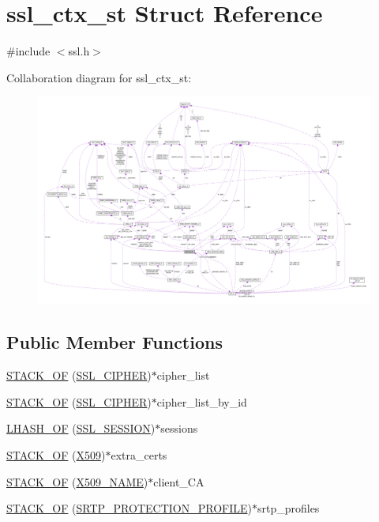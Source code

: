 \hypertarget{structssl__ctx__st}{}\section{ssl\+\_\+ctx\+\_\+st Struct Reference}
\label{structssl__ctx__st}


{\ttfamily \#include $<$ssl.\+h$>$}



Collaboration diagram for ssl\+\_\+ctx\+\_\+st\+:
\nopagebreak
\begin{figure}[H]
\begin{center}
\leavevmode
\includegraphics[width=350pt]{structssl__ctx__st__coll__graph}
\end{center}
\end{figure}
\subsection*{Public Member Functions}
\begin{DoxyCompactItemize}
\item 
\hyperlink{structssl__ctx__st_aeae48802a98db69348bba2b610fd5c0c}{S\+T\+A\+C\+K\+\_\+\+OF} (\hyperlink{ssl_8h_a548d7a5d565a9e0e9bd45c49f8c95701}{S\+S\+L\+\_\+\+C\+I\+P\+H\+ER})$\ast$cipher\+\_\+list
\item 
\hyperlink{structssl__ctx__st_aea9ca79cf751419a511ce4f171fd9064}{S\+T\+A\+C\+K\+\_\+\+OF} (\hyperlink{ssl_8h_a548d7a5d565a9e0e9bd45c49f8c95701}{S\+S\+L\+\_\+\+C\+I\+P\+H\+ER})$\ast$cipher\+\_\+list\+\_\+by\+\_\+id
\item 
\hyperlink{structssl__ctx__st_a31f304395cbaf8bdbf2eae3693f3d0f4}{L\+H\+A\+S\+H\+\_\+\+OF} (\hyperlink{ssl_8h_a8dd6b81bbcb1b2d769235c37779d2a94}{S\+S\+L\+\_\+\+S\+E\+S\+S\+I\+ON})$\ast$sessions
\item 
\hyperlink{structssl__ctx__st_aeb590bc7c9be569fa3d60563763c8fca}{S\+T\+A\+C\+K\+\_\+\+OF} (\hyperlink{ossl__typ_8h_a4f666bde6518f95deb3050c54b408416}{X509})$\ast$extra\+\_\+certs
\item 
\hyperlink{structssl__ctx__st_aa1061d7d0405217fb37a7d822716e92a}{S\+T\+A\+C\+K\+\_\+\+OF} (\hyperlink{ossl__typ_8h_a5c5fc036757e87b9bd163d0221696533}{X509\+\_\+\+N\+A\+ME})$\ast$client\+\_\+\+CA
\item 
\hyperlink{structssl__ctx__st_abe263c734b3b85b909a6a0accef3a66f}{S\+T\+A\+C\+K\+\_\+\+OF} (\hyperlink{ssl_8h_ad71374b5a3df5292d0722b703841292e}{S\+R\+T\+P\+\_\+\+P\+R\+O\+T\+E\+C\+T\+I\+O\+N\+\_\+\+P\+R\+O\+F\+I\+LE})$\ast$srtp\+\_\+profiles
\end{DoxyCompactItemize}
